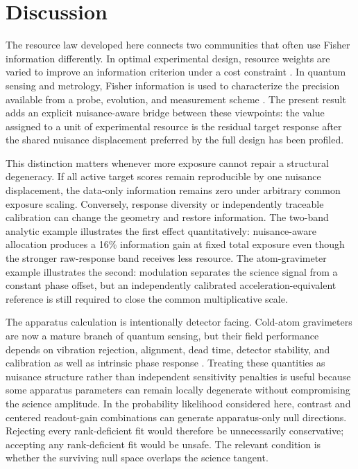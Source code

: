 \section{Discussion}
\label{sec:discussion}

The resource law developed here connects two communities that often use Fisher information differently. In optimal experimental design, resource weights are varied to improve an information criterion under a cost constraint \cite{Huan2024,WatsonPan2023}. In quantum sensing and metrology, Fisher information is used to characterize the precision available from a probe, evolution, and measurement scheme \cite{Giovannetti2011,Pezze2018,Liu2020}. The present result adds an explicit nuisance-aware bridge between these viewpoints: the value assigned to a unit of experimental resource is the residual target response after the shared nuisance displacement preferred by the full design has been profiled.

This distinction matters whenever more exposure cannot repair a structural degeneracy. If all active target scores remain reproducible by one nuisance displacement, the data-only information remains zero under arbitrary common exposure scaling. Conversely, response diversity or independently traceable calibration can change the geometry and restore information. The two-band analytic example illustrates the first effect quantitatively: nuisance-aware allocation produces a 16\% information gain at fixed total exposure even though the stronger raw-response band receives less resource. The atom-gravimeter example illustrates the second: modulation separates the science signal from a constant phase offset, but an independently calibrated acceleration-equivalent reference is still required to close the common multiplicative scale.

The apparatus calculation is intentionally detector facing. Cold-atom gravimeters are now a mature branch of quantum sensing, but their field performance depends on vibration rejection, alignment, dead time, detector stability, and calibration as well as intrinsic phase response \cite{Bongs2019,Geiger2020}. Treating these quantities as nuisance structure rather than independent sensitivity penalties is useful because some apparatus parameters can remain locally degenerate without compromising the science amplitude. In the probability likelihood considered here, contrast and centered readout-gain combinations can generate apparatus-only null directions. Rejecting every rank-deficient fit would therefore be unnecessarily conservative; accepting any rank-deficient fit would be unsafe. The relevant condition is whether the surviving null space overlaps the science tangent.

